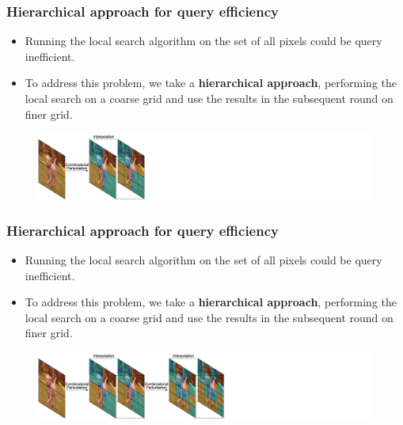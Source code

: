 \documentclass[10pt,mathserif]{beamer}
\begin{document}
\begin{frame}
    \frametitle{Hierarchical approach for query efficiency}
    \begin{itemize}\itemsep=12pt
        \item Running the local search algorithm on the set of all pixels could be query inefficient.
        \item To address this problem, we take a \textbf{hierarchical approach}, performing the local search on a coarse grid and use the results in the subsequent round on finer grid.
    \end{itemize}
    \begin{figure}
        \centering
        \hspace*{-2.5em}
        \includegraphics[scale=0.35]{figures/hierarchical_2.png}
    \end{figure}
\end{frame}

\begin{frame}
    \frametitle{Hierarchical approach for query efficiency}
    \begin{itemize}\itemsep=12pt
        \item Running the local search algorithm on the set of all pixels could be query inefficient.
        \item To address this problem, we take a \textbf{hierarchical approach}, performing the local search on a coarse grid and use the results in the subsequent round on finer grid.
    \end{itemize}
    \begin{figure}
        \centering
        \hspace*{-2.5em}
        \includegraphics[scale=0.35]{figures/hierarchical_3.png}
    \end{figure}
\end{frame}
\end{document}

